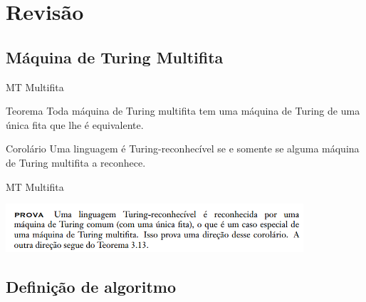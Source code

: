 \documentclass[xcolor=dvipsnames,table]{beamer}
\begin{document}
\section{Revisão}
	\subsection{Máquina de Turing Multifita}
	
	\begin{frame}{MT Multifita}
		\begin{block}{Teorema}
			Toda máquina de Turing multifita tem uma máquina de Turing de uma única fita que lhe é equivalente.
		\end{block}
		\begin{block}{Corolário}
			Uma linguagem é Turing-reconhecível se e somente se alguma máquina de Turing multifita a reconhece.
		\end{block}
	\end{frame}
	
	\begin{frame}{MT Multifita}
		\begin{center}
			\includegraphics[height=1.8cm]{images/provaCorolario.png}
		\end{center}
	\end{frame}
	
	\subsection{Definição de algoritmo}
\end{document}
